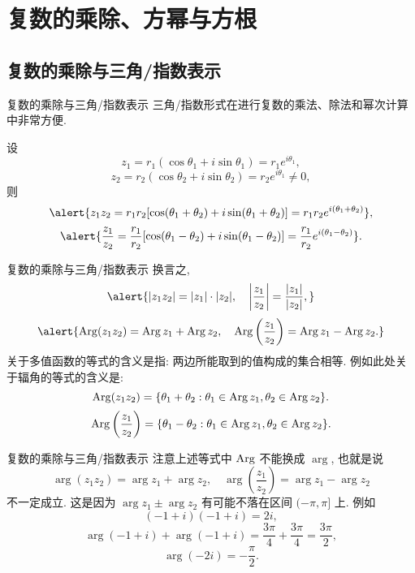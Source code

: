 \section{复数的乘除、方幂与方根}

\subsection{复数的乘除与三角/指数表示}
\begin{frame}{复数的乘除与三角/指数表示}
	\onslide<+->
	三角/指数形式在进行复数的乘法、除法和幂次计算中非常方便.

	\onslide<+->
	\begin{theorem}
		设
		\[z_1=r_1(\cos\theta_1+i\sin\theta_1)=r_1e^{i\theta_1},\]
		\[z_2=r_2(\cos\theta_2+i\sin\theta_2)=r_2e^{i\theta_1}\neq 0,\]
		则
		\[\alert{z_1z_2=r_1r_2[\cos(\theta_1+\theta_2)+i\sin(\theta_1+\theta_2)]=r_1r_2e^{i(\theta_1+\theta_2)}},\]
		\[\alert{\frac{z_1}{z_2}=\frac{r_1}{r_2}[\cos(\theta_1-\theta_2)+i\sin(\theta_1-\theta_2)]=\frac{r_1}{r_2}e^{i(\theta_1-\theta_2)}}.\]
	\end{theorem}
\end{frame}


\begin{frame}{复数的乘除与三角/指数表示}
	\onslide<+->
	换言之,
	\[\alert{|z_1z_2|=|z_1|\cdot|z_2|,\quad\abs{\frac{z_1}{z_2}}=\frac{|z_1|}{|z_2|},}\]
	\onslide<+->
	\[\alert{\Arg(z_1z_2)=\Arg z_1+\Arg z_2,\quad
	\Arg\left(\frac{z_1}{z_2}\right)=\Arg z_1-\Arg z_2.}\]
	\onslide<+->
	关于多值函数的等式的含义是指: 两边所能取到的值构成的集合相等.
	\onslide<+->
	例如此处关于辐角的等式的含义是:
	\[\operatorname{Arg}(z_1z_2)={\left\{\theta_1+\theta_2:\theta_1\in\operatorname{Arg} z_1,\theta_2\in\operatorname{Arg} z_2\right\}}.\]
	\[\operatorname{Arg}\left(\frac{z_1}{z_2}\right)={\left\{\theta_1-\theta_2:\theta_1\in\operatorname{Arg} z_1,\theta_2\in\operatorname{Arg} z_2\right\}}.\]
\end{frame}


\begin{frame}{复数的乘除与三角/指数表示}
	\onslide<+->
	注意上述等式中 $\operatorname{Arg}$ 不能换成 $\arg$, 也就是说
	\[\arg(z_1z_2)=\arg z_1+\arg z_2,\quad
	\arg\left(\frac{z_1}{z_2}\right)=\arg z_1-\arg z_2\]
	\alert{不一定成立}.
	\onslide<+->
	这是因为 $\arg z_1\pm\arg z_2$ 有可能不落在区间 $(-\pi,\pi]$ 上.
	\onslide<+->
	例如
	\[(-1+i)(-1+i)=2i,\]
	\vspace{-0.5\baselineskip}
	\onslide<+->
	\[\arg(-1+i)+\arg(-1+i)=\frac{3\pi}4+\frac{3\pi}4=\frac{3\pi}2,\]
	\vspace{-0.5\baselineskip}
	\onslide<+->
	\[\arg(-2i)=-\frac\pi2.\]
\end{frame}


